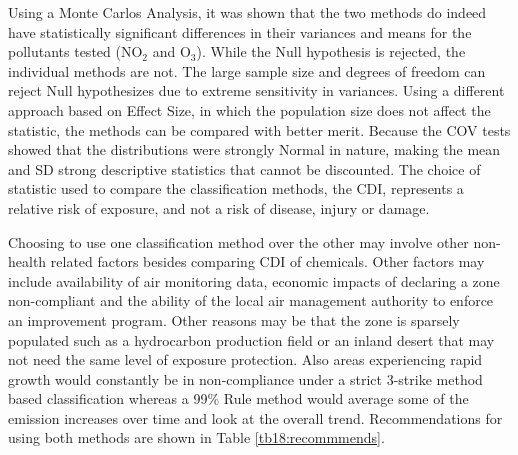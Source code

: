 Using a Monte Carlos Analysis, it was shown that the two methods do indeed have statistically significant differences in their variances and means for the pollutants tested (NO$_{2}$ and O$_{3}$). While the Null hypothesis is rejected, the individual methods are not. The large sample size and degrees of freedom can reject Null hypothesizes due to extreme sensitivity in variances. Using a different approach based on Effect Size, in which the population size does not affect the statistic, the methods can be compared with better merit. Because the COV tests showed that the distributions were strongly Normal in nature, making the mean and SD strong descriptive statistics that cannot be discounted. The choice of statistic used to compare the classification methods, the CDI, represents a relative risk of exposure, and not a risk of disease, injury or damage. 

Choosing to use one classification method over the other may involve other non-health related factors besides comparing CDI of chemicals. Other factors may include availability of air monitoring data, economic impacts of declaring a zone non-compliant and the ability of the local air management authority to enforce an improvement program. Other reasons may be that the zone is sparsely populated such as a hydrocarbon production field or an inland desert that may not need the same level of exposure protection. Also areas experiencing rapid growth would constantly be in non-compliance under a strict 3-strike method based classification whereas a 99\% Rule method would average some of the emission increases over time and look at the overall trend. Recommendations for using both methods are shown in Table \ref{tb18:recommmends}.

% 
\begin{table}[!htb]
\centering
\caption{Recommended uses for classification methods.}
\label{tb18:recommmends}
\end{table}

